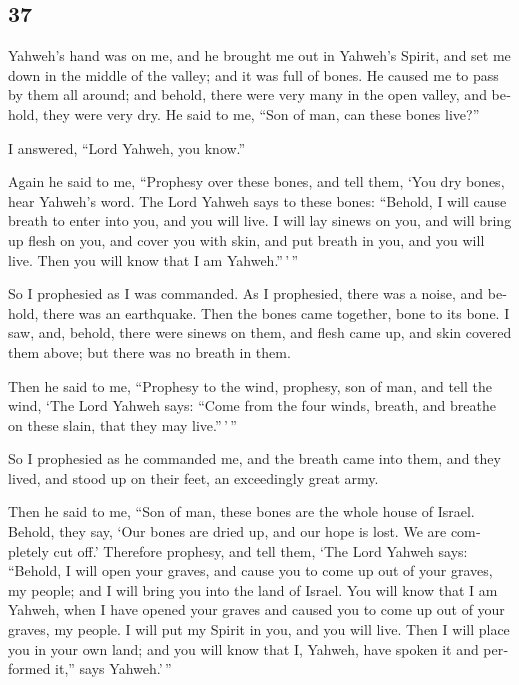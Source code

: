\begin{paracol}{2}
\switchcolumn
\begin{otherlanguage}{english}

\hypertarget{section-73}{%
\section{37}\label{section-73}}

 Yahweh's hand was on me, and he brought me out in
Yahweh's Spirit, and set me down in the middle of the valley; and it was
full of bones.  He caused me to pass by them all around;
and behold, there were very many in the open valley, and behold, they
were very dry.  He said to me, ``Son of man, can these
bones live?''

I answered, ``Lord Yahweh, you know.''

 Again he said to me, ``Prophesy over these bones, and
tell them, `You dry bones, hear Yahweh's word.  The Lord
Yahweh says to these bones: ``Behold, I will cause breath to enter into
you, and you will live.  I will lay sinews on you, and
will bring up flesh on you, and cover you with skin, and put breath in
you, and you will live. Then you will know that I am Yahweh.''\,'\,''

 So I prophesied as I was commanded. As I prophesied,
there was a noise, and behold, there was an earthquake. Then the bones
came together, bone to its bone.  I saw, and, behold,
there were sinews on them, and flesh came up, and skin covered them
above; but there was no breath in them.

 Then he said to me, ``Prophesy to the wind, prophesy, son
of man, and tell the wind, `The Lord Yahweh says: ``Come from the four
winds, breath, and breathe on these slain, that they may live.''\,'\,''

 So I prophesied as he commanded me, and the breath came
into them, and they lived, and stood up on their feet, an exceedingly
great army.

 Then he said to me, ``Son of man, these bones are the
whole house of Israel. Behold, they say, `Our bones are dried up, and
our hope is lost. We are completely cut off.'  Therefore
prophesy, and tell them, `The Lord Yahweh says: ``Behold, I will open
your graves, and cause you to come up out of your graves, my people; and
I will bring you into the land of Israel.  You will know
that I am Yahweh, when I have opened your graves and caused you to come
up out of your graves, my people.  I will put my Spirit
in you, and you will live. Then I will place you in your own land; and
you will know that I, Yahweh, have spoken it and performed it,'' says
Yahweh.'\,''


\end{otherlanguage}
\end{paracol}
